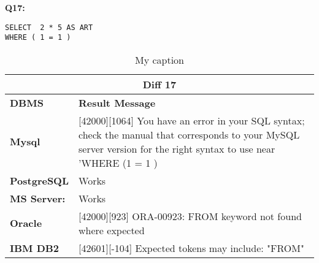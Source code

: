 \begin{mdframed}[backgroundcolor=lightgray!20] 
\textbf{Q17:}
\begin{lstlisting}
SELECT  2 * 5 AS ART
WHERE ( 1 = 1 )
\end{lstlisting}
\end{mdframed} 

\begin{table}[h]
\centering
\caption{My caption}
\label{my-label}
\begin{tabular}{|p{2cm}|p{12cm}|}
\hline
\multicolumn{2}{|c|}{\textbf{Diff 17}}                                                                                                                                                                                                          \\ \hline
\textbf{DBMS}                              & \textbf{Result Message}                                                                                                                                                                            \\ \hline
{\color[HTML]{333333} \textbf{Mysql}}      & {\color[HTML]{333333} {[}42000{]}{[}1064{]} You have an error in your SQL syntax; check the manual that corresponds to your MySQL server version for the right syntax to use near 'WHERE (1 = 1 )} \\ \hline
{\color[HTML]{333333} \textbf{PostgreSQL}} & {\color[HTML]{333333} Works}                                                                                                                                                                       \\ \hline
{\color[HTML]{333333} \textbf{MS Server:}} & {\color[HTML]{333333} Works}                                                                                                                                                                       \\ \hline
\textbf{Oracle}                            & {[}42000{]}{[}923{]} ORA-00923: FROM keyword not found where expected                                                                                                                              \\ \hline
\textbf{IBM DB2}                           & {[}42601{]}{[}-104{]} Expected tokens may include: "FROM"                                                                                                                                          \\ \hline
\end{tabular}
\end{table}

